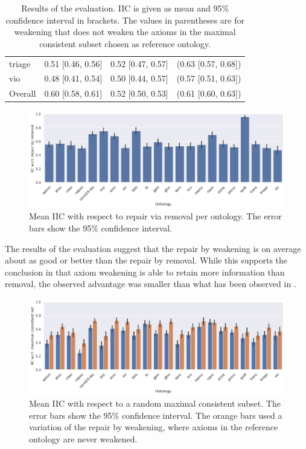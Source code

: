 \begin{table}[ht]
\begin{tabular}{|l|cc@{ }c|}
    triage & 0.51 [0.46, 0.56] & 0.52 [0.47, 0.57] & (0.63 [0.57, 0.68]) \\
    vio & 0.48 [0.41, 0.54] & 0.50 [0.44, 0.57] & (0.57 [0.51, 0.63]) \\
    \hline
    Overall & 0.60 [0.58, 0.61] & 0.52 [0.50, 0.53] & (0.61 [0.60, 0.63]) \\
    \hline
  \end{tabular}
  \caption{Results of the evaluation. IIC is given as mean and 95\% confidence interval in brackets. The values in parentheses are for weakening that does not weaken the axioms in the maximal consistent subset chosen as reference ontology.}
  \label{table:results}
\end{table}

\begin{figure}[ht]
  \centering
  \includegraphics[width=\textwidth]{resources/iic-remove-ontology-bar.png}
  \caption{Mean IIC with respect to repair via removal per ontology. The error bars show the 95\% confidence interval.}
  \label{fig:results-remove}
\end{figure}

The results of the evaluation suggest that the repair by weakening is on average about as good or better than the repair by removal. While this supports the conclusion in \cite{troquard2018repairing} that axiom weakening is able to retain more information than removal, the observed advantage was smaller than what has been observed in \cite{troquard2018repairing}.

\begin{figure}[ht]
  \centering
  \includegraphics[width=\textwidth]{resources/iic-both-mcs-ontology-bar.png}
  \caption{Mean IIC with respect to a random maximal consistent subset. The error bars show the 95\% confidence interval. The orange bars used a variation of the repair by weakening, where axioms in the reference ontology are never weakened.}
  \label{fig:results-mcs}
\end{figure}

